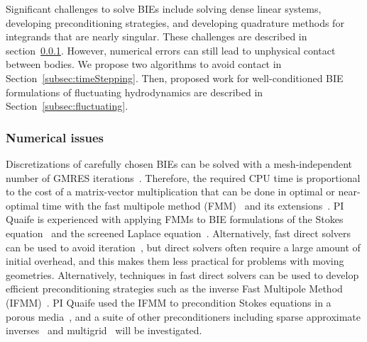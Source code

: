 Significant challenges to solve BIEs include solving dense linear
systems, developing preconditioning strategies, and developing
quadrature methods for integrands that are nearly singular. These
challenges are described in section~\ref{subsec:NumericalIssues}.
However, numerical errors can still lead to unphysical contact between
bodies. We propose two algorithms to avoid contact in
Section~\ref{subsec:timeStepping}. Then, proposed work for
well-conditioned BIE formulations of fluctuating hydrodynamics are
described in Section~\ref{subsec:fluctuating}.


\subsubsection{Numerical issues}
\label{subsec:NumericalIssues}

Discretizations of carefully chosen BIEs can be solved with a
mesh-independent number of GMRES
iterations~\cite{cam-ips-kel-mey-xue1996}. Therefore, the required CPU
time is proportional to the cost of a matrix-vector multiplication that
can be done in optimal or near-optimal time with the fast multipole
method (FMM)~\cite{fmm5} and its extensions~\cite{fmm1, fmm2, fmm3,
fmm4, fmm6, fmm7, fmm8}. PI Quaife is experienced with applying FMMs to
BIE formulations of the Stokes equation~\cite{qua-bir2014,
bys-sha-qua2020} and the screened Laplace equation~\cite{kro-qua2011,
qua2011}. Alternatively, fast direct solvers can be used to avoid
iteration~\cite{fds1, fds2, fds3, fds4, fds5, fds6, fds7, fds8,
ho2016cpam2, ho2016cpam1, minden2016, minden2017siammms}, but direct
solvers often require a large amount of initial overhead, and this makes
them less practical for problems with moving geometries. Alternatively,
techniques in fast direct solvers can be used to develop efficient
preconditioning strategies such as the inverse Fast Multipole Method
(IFMM)~\cite{cou-pou-dar2017}. PI Quaife used the IFMM to precondition
Stokes equations in a porous media~\cite{qua-cou-dar2018}, and a suite
of other preconditioners including sparse approximate
inverses~\cite{che2000} and multigrid~\cite{hem-sch1981, sch1982} will
be investigated.

